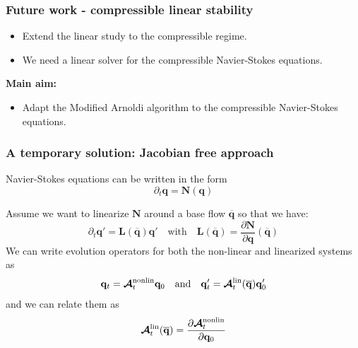 \documentclass[aspectratio=43, xcolor=table]{beamer}
\begin{document}
\begin{frame}
	\frametitle{Future work - compressible linear stability}

	\begin{itemize}
		\item Extend the linear study to the compressible regime.
		\item We need a linear solver for the compressible Navier-Stokes equations.
	\end{itemize}

	\textbf{Main aim:}
	\begin{itemize}
		\item Adapt the Modified Arnoldi algorithm to the compressible Navier-Stokes equations.
	\end{itemize}

\end{frame}
\begin{frame}
	\frametitle{A temporary solution: Jacobian free approach}

	Navier-Stokes equations can be written in the form
	$$
		\partial_t \mathbf{q} = \mathbf{N}(\mathbf{q})
	$$

	Assume we want to linearize $\mathbf{N}$ around a base flow $\mathbf{\overline{q}}$ so that we have:
	$$
		\partial_t \mathbf{q'} = \mathbf{L}({\mathbf{\overline{q}}}) \mathbf{q'} \quad \text{with} \quad \mathbf{L}({\mathbf{\overline{q}}}) = \frac{\partial \mathbf{N}}{\partial \mathbf{q}} ({\mathbf{\overline{q}}})
	$$
	We can write evolution operators for both the non-linear and linearized systems as
	$$
		\mathbf{q}_t = \boldsymbol{\mathrm{\mathcal{A}}}_t^\text{nonlin} \mathbf{q}_0 \quad \text{and} \quad \mathbf{q}_t' = \boldsymbol{\mathrm{\mathcal{A}}}_t^\text{lin} (\mathbf{\overline{q}})\mathbf{q}_0'
	$$
	and we can relate them as
	$$
		\boldsymbol{\mathrm{\mathcal{A}}}_t^\text{lin}(\mathbf{\overline{q}}) = \pdv{\boldsymbol{\mathrm{\mathcal{A}}}_t^\text{nonlin}}{\mathbf{q}_0}(\mathbf{\overline{q}})
	$$

\end{frame}
\end{document}
